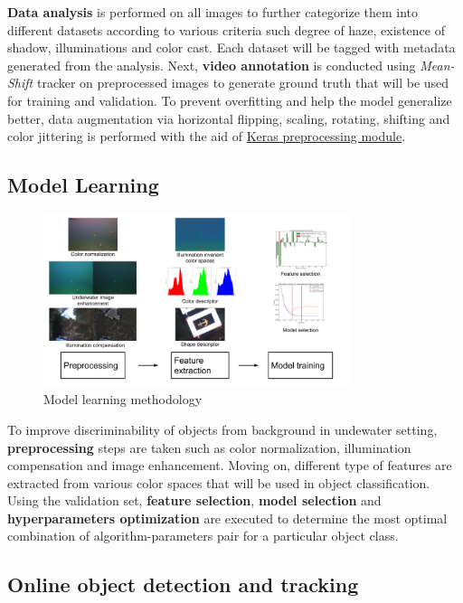\documentclass[fypca]{socreport}
\begin{document}
\textbf{Data analysis} is performed on all images to further categorize them into
different datasets according to various criteria such degree of haze, existence
of shadow, illuminations and color cast. Each dataset will be tagged with
metadata generated from the analysis. Next, \textbf{video annotation} is
conducted using \textit{Mean-Shift} tracker on preprocessed images to generate
ground truth that will be used for training and validation. To prevent
overfitting and help the model generalize better, data augmentation via
horizontal flipping, scaling, rotating, shifting and color jittering is
performed with the aid of \href{https://keras.io/preprocessing/image/}{Keras
  preprocessing module}.

\subsection{Model Learning}

\begin{figure}[H]
\centering
  \includegraphics[width=0.8\textwidth, height=0.3\textheight]{training_method.png}
  \caption{Model learning methodology}
  \label{fig:training_methodology}
\end{figure}

To improve discriminability of objects from background in undewater setting,
\textbf{preprocessing} steps are taken such as color normalization, illumination
compensation and image enhancement. Moving on, different type of features are
extracted from various color spaces that will be used in object classification.
Using the validation set, \textbf{feature selection}, \textbf{model selection}
and \textbf{hyperparameters optimization} are executed to determine the most
optimal combination of algorithm-parameters pair for a particular object class.

\subsection{Online object detection and tracking}
\end{document}

